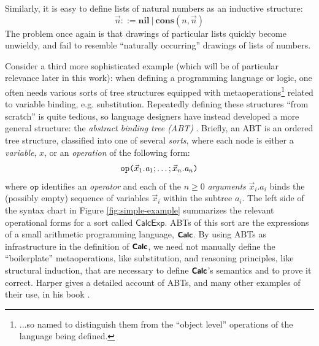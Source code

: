Similarly, it is easy to define lists of natural numbers as an inductive structure:
\[ \vec{n} ::= \textbf{nil} ~\vert~ \textbf{cons}(n, \vec{n}) \]
The problem once again is that drawings of particular lists quickly become unwieldy, and fail to resemble ``naturally occurring'' drawings of lists of numbers.

Consider a third more sophisticated example (which will be of particular relevance later in this work): when defining a programming language or logic, one often needs various sorts of tree structures equipped with metaoperations\footnote{...so named to distinguish them from the ``object level'' operations of the language being defined.} related to variable binding, e.g. substitution. Repeatedly defining these structures ``from scratch'' is quite tedious, so language designers have instead developed  a more general structure: the \emph{abstract binding tree (ABT)} \cite{Aczel78,pfpl,gabbay2002new}. Briefly, an ABT is an ordered tree structure, classified into one of several \emph{sorts}, where each node is either a \emph{variable}, $x$, or an \emph{operation} of the following form:
\begin{equation*}
\texttt{op}\texttt{(}\vec{x}_1.\mathit{a}_1; \ldots; \vec{x}_n.\mathit{a}_n\texttt{)}
\end{equation*} 
where $\texttt{op}$ identifies an \emph{operator} and each of the $n \geq 0$ \emph{arguments} $\vec{x}_i.\mathit{a}_i$ binds the (possibly empty) sequence of variables $\vec{x}_i$ within the subtree $a_i$. The left side of the syntax chart in Figure \ref{fig:simple-example} summarizes the relevant operational forms for a sort called $\mathsf{CalcExp}$. ABTs of this sort are the expressions of a small arithmetic programming language,  $\textsf{\textbf{\small Calc}}$. By using  ABTs as infrastructure in the definition of $\textsf{\textbf{\small Calc}}$, we need not manually define the ``boilerplate'' metaoperations, like substitution, and reasoning principles, like structural induction, that are necessary to define $\textsf{\textbf{\small Calc}}$'s semantics and to prove it correct. {Harper gives a detailed account of ABTs, and many other examples of their use, in his book \cite{pfpl}.} 



